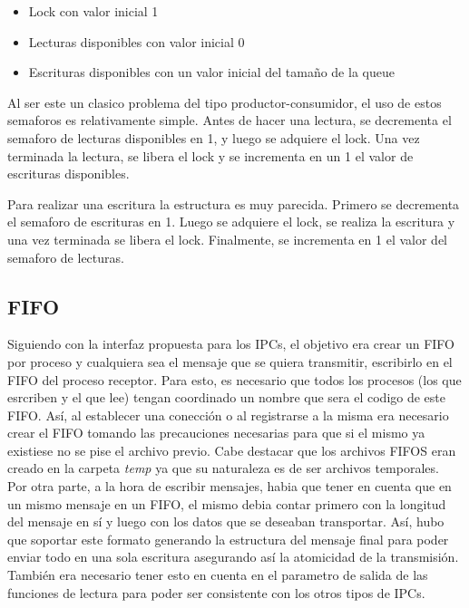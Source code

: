 \documentclass[a4paper,10pt]{article}
\begin{document}
\begin{itemize}
\item Lock con valor inicial 1
\item Lecturas disponibles con valor inicial 0
\item Escrituras disponibles con un valor inicial del tamaño de la queue
\end{itemize}

Al ser este un clasico problema del tipo productor-consumidor, el uso de estos semaforos es relativamente simple.
Antes de hacer una lectura, se decrementa el semaforo de lecturas disponibles en 1, y luego se adquiere el lock.
Una vez terminada la lectura, se libera el lock y se incrementa en un 1 el valor de escrituras disponibles.

Para realizar una escritura la estructura es muy parecida.
Primero se decrementa el semaforo de escrituras en 1.
Luego se adquiere el lock, se realiza la escritura y una vez terminada se libera el lock.
Finalmente, se incrementa en 1 el valor del semaforo de lecturas.

\subsection{FIFO}
Siguiendo con la interfaz propuesta para los IPCs, el objetivo era crear un FIFO por proceso y cualquiera sea el
mensaje que se quiera transmitir, escribirlo en el FIFO del proceso receptor. Para esto, es necesario que todos los
procesos (los que esrcriben y el que lee) tengan coordinado un nombre que sera el codigo de este FIFO. Así,
al establecer una conección o al registrarse a la misma era necesario crear el FIFO tomando las precauciones necesarias
para que si el mismo ya existiese no se pise el archivo previo. Cabe destacar que los archivos FIFOS eran creado en
la carpeta \textit{temp} ya que su naturaleza es de ser archivos temporales. \\

Por otra parte, a la hora de escribir mensajes, habia que tener en cuenta que en un mismo mensaje en un FIFO, el mismo
debia contar primero con la longitud del mensaje en sí y luego con los datos que se deseaban transportar. Así, hubo
que soportar este formato generando la estructura del mensaje final para poder enviar todo en una sola escritura
asegurando así la atomicidad de la transmisión. También era necesario tener esto en cuenta en el parametro de salida 
de las funciones de lectura para poder ser consistente con los otros tipos de IPCs.
\end{document}
